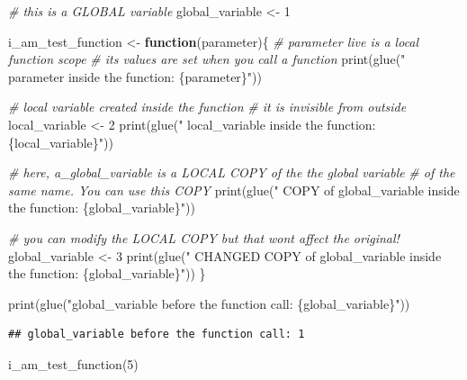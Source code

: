 \documentclass[
]{book}
\newenvironment{Shaded}{\begin{snugshade}}{\end{snugshade}}
\newcommand{\CommentTok}[1]{\textcolor[rgb]{0.56,0.35,0.01}{\textit{#1}}}
\newcommand{\ControlFlowTok}[1]{\textcolor[rgb]{0.13,0.29,0.53}{\textbf{#1}}}
\newcommand{\DecValTok}[1]{\textcolor[rgb]{0.00,0.00,0.81}{#1}}
\newcommand{\FunctionTok}[1]{\textcolor[rgb]{0.00,0.00,0.00}{#1}}
\newcommand{\NormalTok}[1]{#1}
\newcommand{\OtherTok}[1]{\textcolor[rgb]{0.56,0.35,0.01}{#1}}
\newcommand{\StringTok}[1]{\textcolor[rgb]{0.31,0.60,0.02}{#1}}
\begin{document}
\begin{Shaded}
\begin{Highlighting}[]
\CommentTok{\# this is a GLOBAL variable}
\NormalTok{global\_variable }\OtherTok{\textless{}{-}} \DecValTok{1}

\NormalTok{i\_am\_test\_function }\OtherTok{\textless{}{-}} \ControlFlowTok{function}\NormalTok{(parameter)\{}
  \CommentTok{\# parameter live is a local function scope}
  \CommentTok{\# its values are set when you call a function}
  \FunctionTok{print}\NormalTok{(}\FunctionTok{glue}\NormalTok{(}\StringTok{"  parameter inside the function: \{parameter\}"}\NormalTok{))}
  
  \CommentTok{\# local variable created inside the function}
  \CommentTok{\# it is invisible from outside}
\NormalTok{  local\_variable }\OtherTok{\textless{}{-}} \DecValTok{2}
  \FunctionTok{print}\NormalTok{(}\FunctionTok{glue}\NormalTok{(}\StringTok{"  local\_variable inside the function: \{local\_variable\}"}\NormalTok{))}
  
  \CommentTok{\# here, a\_global\_variable is a LOCAL COPY of the the global variable}
  \CommentTok{\# of the same name. You can use this COPY}
  \FunctionTok{print}\NormalTok{(}\FunctionTok{glue}\NormalTok{(}\StringTok{"  COPY of global\_variable inside the function: \{global\_variable\}"}\NormalTok{))}
  
  \CommentTok{\# you can modify the LOCAL COPY but that won\textquotesingle{}t affect the original!}
\NormalTok{  global\_variable }\OtherTok{\textless{}{-}} \DecValTok{3}
  \FunctionTok{print}\NormalTok{(}\FunctionTok{glue}\NormalTok{(}\StringTok{"  CHANGED COPY of global\_variable inside the function: \{global\_variable\}"}\NormalTok{))}
\NormalTok{\}}

\FunctionTok{print}\NormalTok{(}\FunctionTok{glue}\NormalTok{(}\StringTok{"global\_variable before the function call: \{global\_variable\}"}\NormalTok{))}
\end{Highlighting}
\end{Shaded}

\begin{verbatim}
## global_variable before the function call: 1
\end{verbatim}

\begin{Shaded}
\begin{Highlighting}[]
\FunctionTok{i\_am\_test\_function}\NormalTok{(}\DecValTok{5}\NormalTok{)}
\end{Highlighting}
\end{Shaded}
\end{document}
